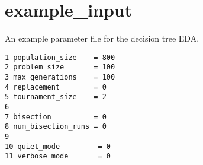 \hypertarget{example__input-example}{
\section{example\_\-input}
}
An example parameter file for the decision tree EDA.



\begin{DocInclude}\begin{verbatim}1 population_size    = 800
2 problem_size       = 100
3 max_generations    = 100
4 replacement        = 0
5 tournament_size    = 2
6 
7 bisection          = 0
8 num_bisection_runs = 0
9 
10 quiet_mode         = 0
11 verbose_mode       = 0
\end{verbatim}
\end{DocInclude}
 